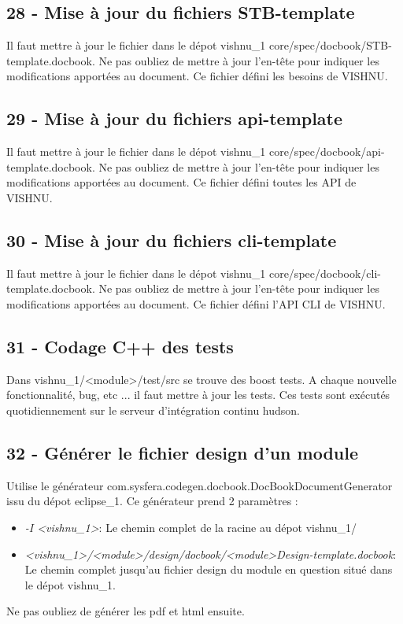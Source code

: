 \documentclass{article}
\begin{document}
\subsection{28 - Mise à jour du fichiers STB-template}
Il faut mettre à jour le fichier dans le dépot vishnu\_1
core/spec/docbook/STB-template.docbook. Ne pas oubliez
de mettre à jour l'en-tête pour indiquer les modifications apportées
au document. Ce fichier défini les besoins de VISHNU.

\subsection{29 - Mise à jour du fichiers api-template}
Il faut mettre à jour le fichier dans le dépot vishnu\_1
core/spec/docbook/api-template.docbook. Ne pas oubliez
de mettre à jour l'en-tête pour indiquer les modifications apportées
au document. Ce fichier défini toutes les API de VISHNU.

\subsection{30 - Mise à jour du fichiers cli-template}
Il faut mettre à jour le fichier dans le dépot vishnu\_1
core/spec/docbook/cli-template.docbook. Ne pas oubliez
de mettre à jour l'en-tête pour indiquer les modifications apportées
au document. Ce fichier défini l'API CLI de VISHNU.

\subsection{31 - Codage C++ des tests}
Dans vishnu\_1/<module>/test/src se trouve des boost tests. A chaque nouvelle
fonctionnalité, bug, etc ... il faut mettre à jour les tests. Ces tests sont
exécutés quotidiennement sur le serveur d'intégration continu hudson.

\subsection{32 - Générer le fichier design d'un module}
Utilise le générateur com.sysfera.codegen.docbook.DocBookDocumentGenerator
issu du dépot eclipse\_1. Ce générateur prend 2 paramètres :
\begin{itemize}
\item \textit{-I <vishnu\_1>}: Le chemin complet de la racine au dépot 
vishnu\_1/
\item \textit{<vishnu\_1>/<module>/design/docbook/<module>Design-template.docbook}:
 Le chemin complet jusqu'au fichier design du module en question
 situé dans le dépot vishnu\_1.
\end{itemize}
Ne pas oubliez de générer les pdf et html ensuite.
\end{document}
